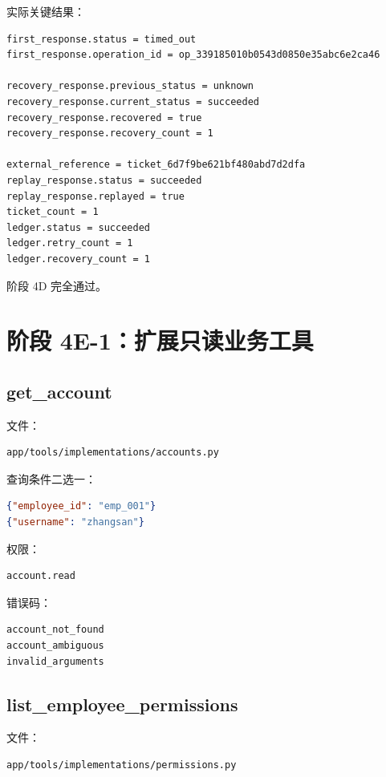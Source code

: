 \documentclass[11pt,a4paper]{ctexart}
\begin{document}
实际关键结果：

\begin{lstlisting}
first_response.status = timed_out
first_response.operation_id = op_339185010b0543d0850e35abc6e2ca46

recovery_response.previous_status = unknown
recovery_response.current_status = succeeded
recovery_response.recovered = true
recovery_response.recovery_count = 1

external_reference = ticket_6d7f9be621bf480abd7d2dfa
replay_response.status = succeeded
replay_response.replayed = true
ticket_count = 1
ledger.status = succeeded
ledger.retry_count = 1
ledger.recovery_count = 1
\end{lstlisting}

阶段 4D 完全通过。

\section{阶段 4E-1：扩展只读业务工具}

\subsection{get\_account}

文件：

\begin{lstlisting}
app/tools/implementations/accounts.py
\end{lstlisting}

查询条件二选一：

\begin{lstlisting}[language=JSON]
{"employee_id": "emp_001"}
{"username": "zhangsan"}
\end{lstlisting}

权限：

\begin{lstlisting}
account.read
\end{lstlisting}

错误码：

\begin{lstlisting}
account_not_found
account_ambiguous
invalid_arguments
\end{lstlisting}

\subsection{list\_employee\_permissions}

文件：

\begin{lstlisting}
app/tools/implementations/permissions.py
\end{lstlisting}
\end{document}
